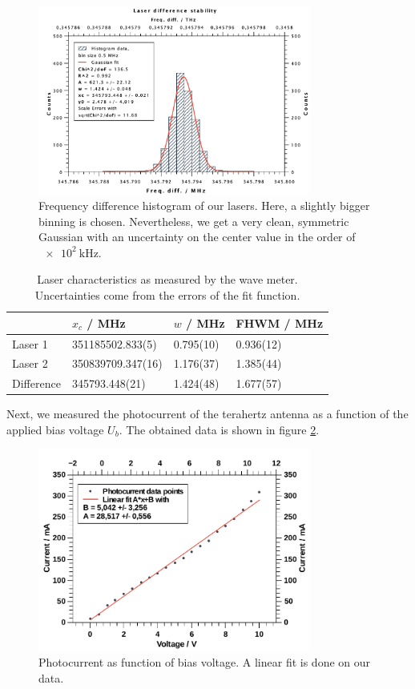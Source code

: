 \documentclass[a4paper,10pt]{scrartcl}
\begin{document}
\begin{figure}[H]
\centering
\includegraphics[width=0.8\textwidth]{img/differencestab}
\caption{Frequency difference histogram of our lasers. Here, a slightly bigger binning is chosen. Nevertheless, we get a very clean, symmetric Gaussian with an uncertainty on the center value in the order of $\SI{e2}{\kilo\hertz}$.}
\label{fig:laserdifference}
\end{figure}

\begin{table}
\centering
\caption{Laser characteristics as measured by the wave meter. Uncertainties come from the errors of the fit function. \label{tab:laser}}
    \begin{tabular}{l|l|l|l}
    ~          & $x_c$ / MHz       & $w$ / MHz & FHWM / MHz \\ \hline
    Laser 1    & 351185502.833(5)  & 0.795(10) & 0.936(12)    \\
    Laser 2    & 350839709.347(16) & 1.176(37) & 1.385(44)    \\
    Difference & 345793.448(21)    & 1.424(48) & 1.677(57)    \\
    \end{tabular}
\end{table}


Next, we measured the photocurrent of the terahertz antenna as a function of the applied bias voltage $U_b$. The obtained data is shown in figure \ref{fig:photocurrent}.

\begin{figure}[H]
\centering
\includegraphics[width=0.8\textwidth]{img/photocurrent}
\caption{Photocurrent as function of bias voltage. A linear fit is done on our data.}
\label{fig:photocurrent}
\end{figure}
\end{document}
